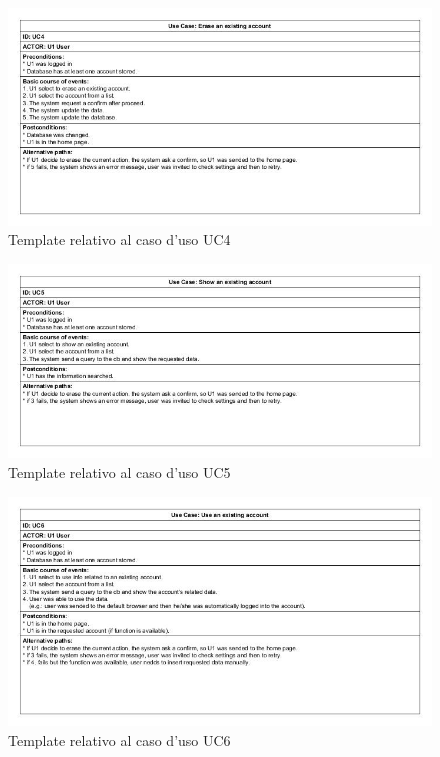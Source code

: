 \documentclass[a4paper,10pt]{report} %
\begin{document}
		\begin{figure}[htbp]
			\centering
			\includegraphics[width = \textwidth]{immagini/USE_CASE_TEMPLATE/UC04.jpg}
			\caption{Template relativo al caso d'uso UC4}
			\end{figure}
		\begin{figure}[htbp]
			\centering
			\includegraphics[width = \textwidth]{immagini/USE_CASE_TEMPLATE/UC05.jpg}
			\caption{Template relativo al caso d'uso UC5}
			\end{figure}
		\begin{figure}[htbp]
			\centering
			\includegraphics[width = \textwidth]{immagini/USE_CASE_TEMPLATE/UC06.jpg}
			\caption{Template relativo al caso d'uso UC6}
			\end{figure}
\end{document}
